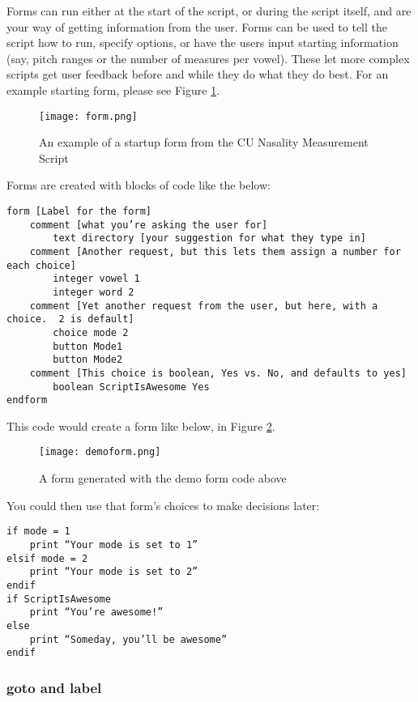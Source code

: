 \documentclass[11pt]{article}
\begin{document}
Forms can run either at the start of the script, or during the script
itself, and are your way of getting information from the user. Forms can
be used to tell the script how to run, specify options, or have the
users input starting information (say, pitch ranges or the number of
measures per vowel). These let more complex scripts get user feedback
before and while they do what they do best. For an example starting
form, please see Figure \ref{form}.

\begin{figure}
  \centerline{
    \mbox{\texttt{[image: form.png]}}
  }
    \caption{An example of a startup form from the CU Nasality Measurement Script\label{form}}
  
  \end{figure}

Forms are created with blocks of code like the below:

\begin{verbatim}
form [Label for the form]
    comment [what you’re asking the user for]
        text directory [your suggestion for what they type in]
    comment [Another request, but this lets them assign a number for each choice]
        integer vowel 1
        integer word 2
    comment [Yet another request from the user, but here, with a choice.  2 is default]
        choice mode 2
        button Mode1
        button Mode2
    comment [This choice is boolean, Yes vs. No, and defaults to yes]
        boolean ScriptIsAwesome Yes
endform
\end{verbatim}

This code would create a form like below, in Figure \ref{demoform}.

\begin{figure}
  \centerline{
    \mbox{\texttt{[image: demoform.png]}}
  }
    \caption{A form generated with the demo form code above\label{demoform}}
  
  \end{figure}

You could then use that form's choices to make decisions later:

\begin{verbatim}
if mode = 1
    print “Your mode is set to 1”
elsif mode = 2
    print “Your mode is set to 2”
endif
if ScriptIsAwesome
    print “You’re awesome!”
else
    print “Someday, you’ll be awesome”
endif
\end{verbatim} 
\pagebreak

\hypertarget{goto-and-label}{%
\subsubsection{goto and label}\label{goto-and-label}}
\end{document}
